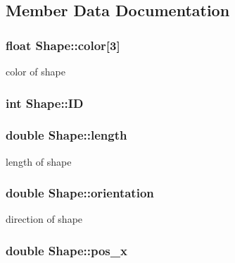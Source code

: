 \subsection{Member Data Documentation}
\hypertarget{classShape_a9f925188936af909e796807fc75c1501}{
\subsubsection[{color}]{\setlength{\rightskip}{0pt plus 5cm}float Shape\-::color\mbox{[}3\mbox{]}\hspace{0.3cm}{\ttfamily [private]}}}\label{classShape_a9f925188936af909e796807fc75c1501}
color of shape \hypertarget{classShape_a24a25c3d22ee7e05d0439f765f247125}{
\subsubsection[{I\-D}]{\setlength{\rightskip}{0pt plus 5cm}int Shape\-::\-I\-D\hspace{0.3cm}{\ttfamily [private]}}}\label{classShape_a24a25c3d22ee7e05d0439f765f247125}
\hypertarget{classShape_ac63ea3d2c8a8ad0481ec5f6cb9b5dbfc}{
\subsubsection[{length}]{\setlength{\rightskip}{0pt plus 5cm}double Shape\-::length\hspace{0.3cm}{\ttfamily [private]}}}\label{classShape_ac63ea3d2c8a8ad0481ec5f6cb9b5dbfc}
length of shape \hypertarget{classShape_a0bbdd420c8befa0a9c5fc95954205e9d}{
\subsubsection[{orientation}]{\setlength{\rightskip}{0pt plus 5cm}double Shape\-::orientation\hspace{0.3cm}{\ttfamily [private]}}}\label{classShape_a0bbdd420c8befa0a9c5fc95954205e9d}
direction of shape \hypertarget{classShape_ae07fa065912725b9382c9b58dcaa3a2c}{
\subsubsection[{pos\-\_\-x}]{\setlength{\rightskip}{0pt plus 5cm}double Shape\-::pos\-\_\-x\hspace{0.3cm}{\ttfamily [private]}}}\label{classShape_ae07fa065912725b9382c9b58dcaa3a2c}
